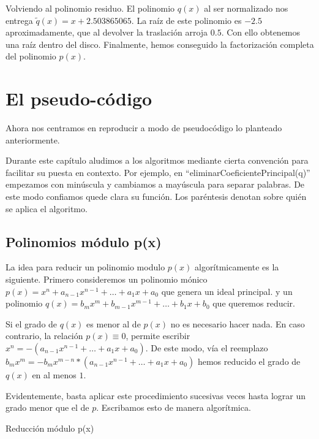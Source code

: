 \documentclass[oneside,11pt]{book}
\theoremstyle{definition}
\theoremstyle{plain}
\theoremstyle{remark}
\begin{document}
Volviendo al polinomio residuo.
El polinomio $q(x)$ al ser normalizado nos entrega $\tilde{q}(x)=x+2.503865065$. 
La ra\'iz de este polinomio es $-2.5$ aproximadamente, que al devolver la traslaci\'on arroja $0.5$. 
Con ello obtenemos una ra\'iz dentro del disco.
Finalmente, hemos conseguido la  factorizaci\'on completa del polinomio $p(x)$.
\bigskip

\chapter{El pseudo-c\'odigo}

Ahora nos centramos en reproducir a modo de pseudoc\'odigo lo planteado anteriormente.

Durante este cap\'itulo aludimos a los algoritmos mediante cierta 
convenci\'on para facilitar su puesta en contexto. 
Por ejemplo, en ``eliminarCoeficientePrincipal(q)''  
empezamos con min\'uscula y cambiamos a may\'uscula para separar palabras. 
De este modo confiamos quede clara su funci\'on. 
Los par\'entesis denotan sobre qui\'en se aplica el algoritmo.

\section{Polinomios m\'odulo p(x)}

La idea para reducir un polinomio modulo $p(x)$ algor\'itmicamente es la siguiente.
Primero consideremos un polinomio m\'onico $p(x) = x^n+a_{n-1}x^{n-1}+\dots+a_1x+a_0$ que genera un ideal principal. 
y un polinomio $q(x) = b_m x^m + b_{m-1}x^{m-1}+\dots+b_1x+b_0$ que queremos reducir.

Si el grado de $q(x)$ es menor al de $p(x)$ no es necesario hacer nada. 
En caso contrario, la relaci\'on $p(x) \equiv 0$, permite escribir $x^n = -(a_{n-1}x^{n-1}+\dots+a_1x+a_0)$.
De este modo, v\'ia el reemplazo $b_mx^m = -b_mx^{m-n}*(a_{n-1}x^{n-1}+\dots+a_1x+a_0)$ 
hemos reducido el grado de $q(x)$ en al menos $1$.

Evidentemente, basta aplicar este procedimiento sucesivas veces hasta lograr un grado menor que el de $p$. 
Escribamos esto de manera algor\'itmica.

\begin{algorithm}[H]
 \caption{Reducci\'on m\'odulo p(x)}
 
  \SetAlgoLined\DontPrintSemicolon
\end{algorithm}
\end{document}
